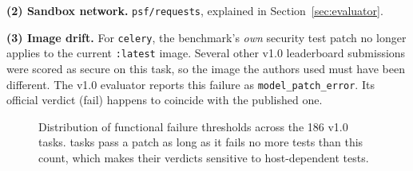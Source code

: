 \documentclass[11pt,a4paper]{article}
\begin{document}
\textbf{(2) Sandbox network.} \texttt{psf/requests}, explained in Section~\ref{sec:evaluator}.

\textbf{(3) Image drift.} For \texttt{celery}, the benchmark's \emph{own} security test patch no longer applies to
the current \texttt{:latest} image. Several other v1.0 leaderboard submissions were scored as secure on this
task, so the image the authors used must have been different. The v1.0 evaluator reports this failure as
\texttt{model\_patch\_error}. Its official verdict (fail) happens to coincide with the published one.

\begin{figure}[h]
\centering
{}
\caption{Distribution of functional failure thresholds across the 186 v1.0 tasks. \ThreshPos{} tasks pass a
patch as long as it fails no more tests than this count, which makes their verdicts sensitive to host-dependent
tests.}
\label{fig:thresh}
\end{figure}

\end{document}
